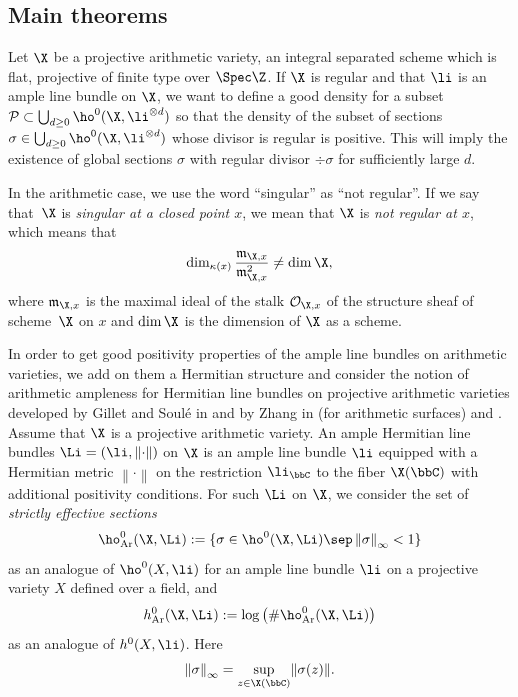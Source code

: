 \subsection{Main theorems}

Let $\X$ be a projective arithmetic variety, \ie an integral separated scheme which is flat, projective of finite type over $\Spec \Z$. If $\X$ is regular and that $\li$ is an ample line bundle on $\X$, we want to define a good density for a subset $\mathcal{P}\subset \bigcup_{d\geq 0}\ho^{0}(\X,\li^{\otimes d})$ so that the density of the subset of sections $\sigma\in \bigcup_{d\geq 0}\ho^{0}(\X,\li^{\otimes d})$ whose divisor is regular is positive. This will imply the existence of global sections $\sigma$ with regular divisor $\div \sigma$ for sufficiently large $d$.

In the arithmetic case, we use the word ``singular'' as ``not regular''. If we say that~$\X$ is \emph{singular at a closed point $x$}, we mean that $\X$ is \emph{not regular at $x$}, which means that
\[
\dim_{\kappa(x)} \frac{\mathfrak{m}_{\X, x}}{\mathfrak{m}^2_{\X, x}}\not=\dim \X,
\]
where $\mathfrak{m}_{\X, x}$ is the maximal ideal of the stalk $\mathcal{O}_{\X, x}$ of the structure sheaf of scheme~$\X$ on $x$ and $\dim\X$ is the dimension of $\X$ as a scheme.

In order to get good positivity properties of the ample line bundles on arithmetic varieties, we add on them a Hermitian structure and consider the notion of arithmetic ampleness for Hermitian line bundles on projective arithmetic varieties developed by Gillet and Soulé in \cite{GS92} and by Zhang in \cite{Zh92} (for arithmetic surfaces) and \cite{Zh95}. Assume that $\X$ is a projective arithmetic variety. An ample Hermitian line bundles $\Li=(\li, \left\lVert \cdot \right\rVert)$ on $\X$ is an ample line bundle $\li$ equipped with a Hermitian metric $\left\lVert \cdot \right\rVert$ on the restriction $\li_{\bbC}$ to the fiber $\X(\bbC)$ with additional positivity conditions. For such $\Li$ on $\X$, we consider the set of \emph{strictly effective sections}
\[
\ho_{\mathrm{Ar}}^0(\X, \Li):= \{ \sigma\in \ho^0(\X, \Li) \sep \left\lVert \sigma \right\rVert_{\infty}<1 \}
\]
as an analogue of $\ho^0(X,\li)$ for an ample line bundle $\li$ on a projective variety $X$ defined over a field, and
\[
h_{\mathrm{Ar}}^0(\X, \Li):= \log\left(\#\ho_{\mathrm{Ar}}^0(\X, \Li) \right)
\]
as an analogue of $h^0(X,\li)$. Here
\[
\left\lVert \sigma \right\rVert_{\infty}=\sup_{z\in \X(\bbC)}\lVert \sigma(z)\rVert.
\]

